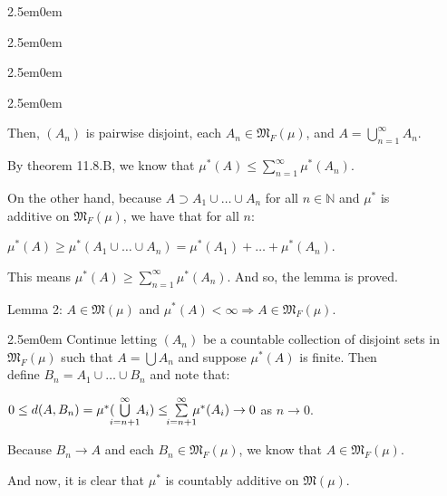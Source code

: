 \documentclass{book}
\newenvironment{myIndent}{%
   \begin{adjustwidth}{2.5em}{0em}%
}{%
   \end{adjustwidth}%
}
\newcommand{\retTwo}{\hfill\bigbreak}
\begin{document}
{\begin{myIndent}
{\begin{myIndent}
{\begin{myIndent}
{\begin{myIndent}
            Then, $(A_n)$ is pairwise disjoint, each $A_n \in \mathfrak{M}_F(\mu)$, and $A = \bigcup\limits_{n=1}^\infty A_n$.\\ [-2pt]
         \end{myIndent}}
   
         By theorem 11.8.B, we know that $\mu^*(A) \leq \sum\limits_{n=1}^\infty \mu^*(A_n)$.\retTwo
   
         On the other hand, because $A \supset A_1 \cup \ldots \cup A_n$ for all $n \in \mathbb{N}$ and $\mu^*$ is\\ additive on $\mathfrak{M}_F(\mu)$, we have that for all $n$:
   
         {\centering $\mu^*(A) \geq \mu^*(A_1 \cup \ldots \cup A_n) = \mu^*(A_1) + \ldots + \mu^*(A_n)$.\retTwo\par}
   
         This means $\mu^*(A) \geq \sum\limits_{n=1}^\infty \mu^*(A_n)$. And so, the lemma is proved.\retTwo
      \end{myIndent}}

      Lemma 2: $A \in \mathfrak{M}(\mu)$ and $\mu^*(A) < \infty \Longrightarrow A \in \mathfrak{M}_F(\mu)$.\\ [-12pt]
      
      {\begin{myIndent}\fontsize{12}{14}\selectfont
         Continue letting $(A_n)$ be a countable collection of disjoint sets in\\ $\mathfrak{M}_F(\mu)$ such that $A = \bigcup A_n$ and suppose $\mu^*(A)$ is finite. Then\\ define $B_n = A_1 \cup \ldots \cup B_n$ and note that:\\ [-10pt]
   
         {\centering $0 \leq d(A, B_n) = \mu^*(\hspace{-0.4em}\bigcup\limits_{i=n+1}^\infty\hspace{-0.5em} A_i) \leq \hspace{-0.4em}\sum\limits_{i=n+1}^\infty\hspace{-0.5em} \mu^*(A_i) \rightarrow 0$ as $n \rightarrow 0$. \retTwo\par}
   
         Because $B_n \rightarrow A$ and each $B_n \in \mathfrak{M}_F(\mu)$, we know that $A \in \mathfrak{M}_F(\mu)$.\retTwo
      \end{myIndent}}

      And now, it is clear that $\mu^*$ is countably additive on $\mathfrak{M}(\mu)$.\\ [-8pt]


\end{myIndent}}
\end{myIndent}}
\end{document}
